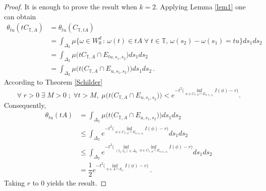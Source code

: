 \documentclass[]{interact}
\newcommand{\1}{\mathbf{1}}
\theoremstyle{plain}%
\theoremstyle{definition}
\theoremstyle{remark}
\begin{document}
\begin{proof}
It is enough to prove the result when $k=2$. Applying Lemma \ref{lem1} one can obtain
\begin{align*}
\theta_{tu}(tC_{\mathbb{T},A})
&=\theta_{tu}(C_{\mathbb{T},tA})\\
&=\int_{\Delta_2  } \mu \big\{ \omega \in W_0^d\, :\,  \omega (t)\in tA  \; \forall \; t\in \mathbb{T}, \,  \omega(s_2)-\omega(s_1)=tu\big\} ds_1ds_2 \\
&=\int_{\Delta_2  } \mu \big(  tC_{\mathbb{T},A} \cap E_{tu,s_1,s_2}\big) ds_1ds_2 \\
&=\int_{\Delta_2  } \mu \big(  t\big( C_{\mathbb{T},A} \cap E_{u,s_1,s_2}\big) \big)ds_1ds_2 \,.
\end{align*}
According to Theorem \ref{Schilder}
$$ \forall \; r>0 \; \exists \; M > 0\; ; \; \forall t> M, \; \mu \big(  t\big( C_{\mathbb{T},A} \cap E_{u,s_1,s_2}\big) \big) < e^{ -t^2 \big( \inf _{\phi \in  C_{\mathbb{T},A} \cap E_{u,s_1,s_2}} I(\phi)-r\big) }. $$
Consequently,
\begin{align*}
\theta_{tu}(tA)
&=\int_{\Delta_2  } \mu \big(  t\big( C_{\mathbb{T},A} \cap E_{u,s_1,s_2}\big) \big)ds_1ds_2 \\
&\leqslant \int_{\Delta_2  } e^{ -t^2 \big( \inf _{\phi \in  C_{\mathbb{T},A} \cap E_{u,s_1,s_2}} I(\phi)-r\big) }ds_1ds_2 \\
&\leqslant \int_{\Delta_2  } e^{ -t^2 \big( \inf _{(t_1,t_2)\in \Delta_2}\inf _{\phi \in  C_{\mathbb{T},A} \cap E_{u,s_1,s_2}} I(\phi)-r\big) }ds_1ds_2 \\
&=\dfrac{1}{2} e^{- t^2 \big(\inf _{\phi \in  A \cap E_{u }} I(\phi)-r\big)  }  \,.
\end{align*}
Taking $r$ to $0$ yields the result.
\end{proof}
\end{document}
